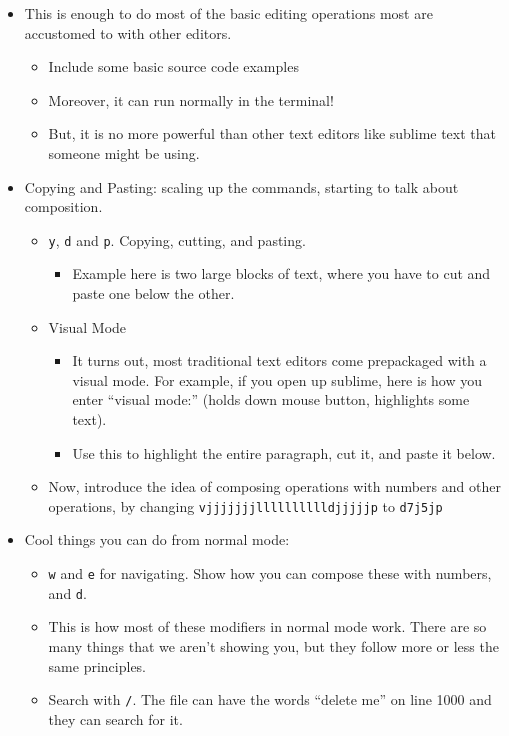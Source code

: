 \documentclass{article}
\begin{document}
\begin{itemize}
\begin{itemize}
\end{itemize}
\item This is enough to do most of the basic editing operations most are accustomed
	to with other editors.
\begin{itemize}
\item Include some basic source code examples
\item Moreover, it can run normally in the terminal!
\item But, it is no more powerful than other text editors like sublime text that
		someone might be using.
\end{itemize}
\item Copying and Pasting: scaling up the commands, starting to talk about
	composition.
\begin{itemize}
\item \verb|y|, \verb|d| and \verb|p|. Copying, cutting, and pasting.
\begin{itemize}
\item Example here is two large blocks of text, where you have to cut and paste
			one below the other.
\end{itemize}
\item Visual Mode
\begin{itemize}
\item It turns out, most traditional text editors come prepackaged with a
			visual mode. For example, if you open up sublime, here is how you enter
			``visual mode:'' (holds down mouse button, highlights some text).
\item Use this to highlight the entire paragraph, cut it, and paste it below.
\end{itemize}
\item Now, introduce the idea of composing operations with numbers and other
		operations, by changing \verb|vjjjjjjjlllllllllldjjjjjp| to \verb|d7j5jp|
\end{itemize}
\item Cool things you can do from normal mode:
\begin{itemize}
\item \verb|w| and \verb|e| for navigating. Show how you can compose these with
		numbers, and \verb|d|.
\item This is how most of these modifiers in normal mode work. There are so many
		things that we aren't showing you, but they follow more or less the same
		principles.
\item Search with \verb|/|. The file can have the words ``delete me'' on line
		1000 and they can search for it.

\end{itemize}
\end{itemize}
\end{document}

